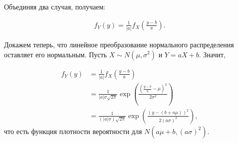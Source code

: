 \documentclass[12pt]{article}
\begin{document}
Объединяя два случая, получаем:

\begin{align*}
  f_Y(y) = \frac{1}{|a|}f_X\left(\frac{y - b}{a}\right).
\end{align*}

Докажем теперь, что линейное преобразование нормального распределения оставляет его нормальным. Пусть $X \sim N(\mu, \sigma^2)$ и $Y = aX + b$. Значит,

\begin{align*}
  f_Y(y) &= \frac{1}{|a|}f_X\left(\frac{y - b}{a}\right) \\
         &= \frac{1}{|a|\sigma \sqrt{2\pi}} \exp\left(\frac{\left(\frac{y - b}{a} - \mu\right)^2}{2\sigma^2}\right) \\
         &= \frac{1}{(|a|\sigma) \sqrt{2\pi}} \exp\left(\frac{\left(y - (b + a\mu)\right)^2}{2(a\sigma)^2}\right),
\end{align*}
что есть функция плотности вероятности для $N(a\mu + b, (a\sigma)^2)$.
\end{document}
